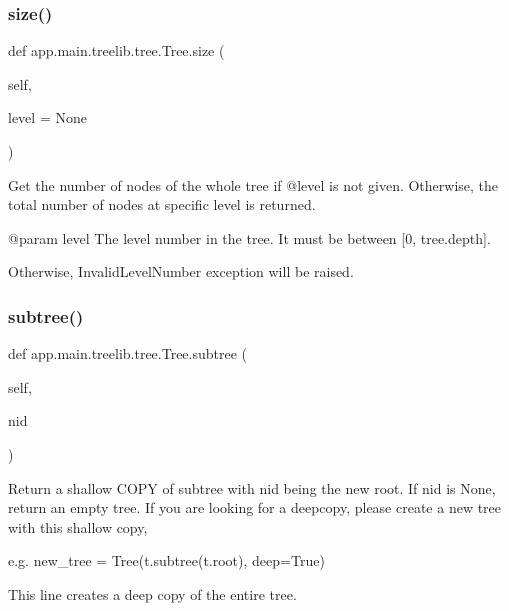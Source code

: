 \subsubsection{\texorpdfstring{size()}{size()}}
{\footnotesize\ttfamily def app.\+main.\+treelib.\+tree.\+Tree.\+size (\begin{DoxyParamCaption}\item[{}]{self,  }\item[{}]{level = {\ttfamily None} }\end{DoxyParamCaption})}

\begin{DoxyVerb}Get the number of nodes of the whole tree if @level is not
given. Otherwise, the total number of nodes at specific level
is returned.

@param level The level number in the tree. It must be between
[0, tree.depth].

Otherwise, InvalidLevelNumber exception will be raised.
\end{DoxyVerb}
 \mbox{\label{classapp_1_1main_1_1treelib_1_1tree_1_1Tree_aed6f1044c77dbea0d03f2858e3a43eb4}} 
\subsubsection{\texorpdfstring{subtree()}{subtree()}}
{\footnotesize\ttfamily def app.\+main.\+treelib.\+tree.\+Tree.\+subtree (\begin{DoxyParamCaption}\item[{}]{self,  }\item[{}]{nid }\end{DoxyParamCaption})}

\begin{DoxyVerb}Return a shallow COPY of subtree with nid being the new root.
If nid is None, return an empty tree.
If you are looking for a deepcopy, please create a new tree
with this shallow copy,

e.g.
    new_tree = Tree(t.subtree(t.root), deep=True)

This line creates a deep copy of the entire tree.
\end{DoxyVerb}
 \mbox{\label{classapp_1_1main_1_1treelib_1_1tree_1_1Tree_ad3d956786e8d7e468425d15dcdd929d0}} 
